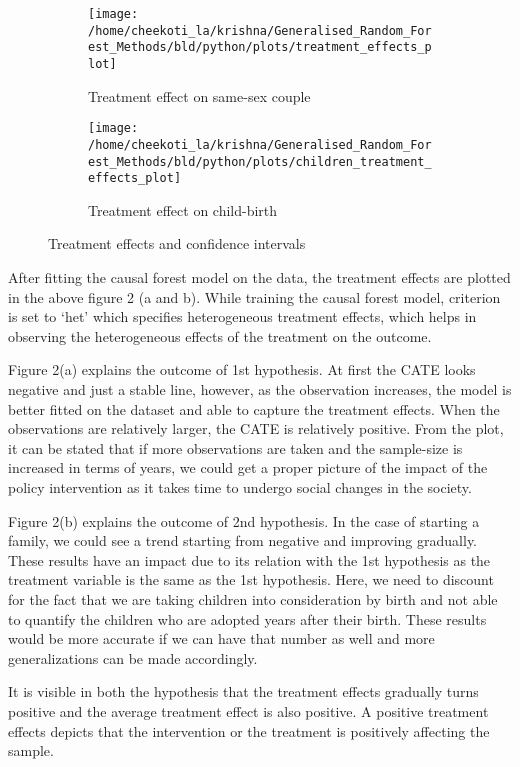 \documentclass[11pt, a4paper, leqno]{article}
\begin{document}
\begin{figure}[!tbp]
  \begin{subfigure}[c]{0.5\textwidth}
    \texttt{[image: /home/cheekoti\_la/krishna/Generalised\_Random\_Forest\_Methods/bld/python/plots/treatment\_effects\_plot]}
    \caption{Treatment effect on same-sex couple}
    \label{fig:f3}
  \end{subfigure}
  \hfill
  \begin{subfigure}[c]{0.5\textwidth}
    \texttt{[image: /home/cheekoti\_la/krishna/Generalised\_Random\_Forest\_Methods/bld/python/plots/children\_treatment\_effects\_plot]}
    \caption{Treatment effect on child-birth}
    \label{fig:f4}
  \end{subfigure}
  \caption{Treatment effects and confidence intervals}
\end{figure}

After fitting the causal forest model on the data, the treatment effects are plotted in the above figure 2 (a and b).
While training the causal forest model, criterion is set to `het' which specifies heterogeneous treatment effects, which helps in observing the heterogeneous effects of the
treatment on the outcome.

Figure 2(a) explains the outcome of 1st hypothesis. At first the CATE looks negative and just a stable line, however, as the observation increases,
 the model is better fitted on the dataset and able to capture the treatment effects. When the observations are relatively larger, the CATE is
 relatively positive. From the plot, it can be stated that if more observations are taken and the sample-size is increased in terms of years, we could
 get a proper picture of the impact of the policy intervention as it takes time to undergo social changes in the society.

Figure 2(b) explains the outcome of 2nd hypothesis. In the case of starting a family, we could see a trend starting from negative and improving
gradually. These results have an impact due to its relation with the 1st hypothesis as the treatment variable is the same as the 1st hypothesis.
Here, we need to discount for the fact that we are taking children into consideration by birth and not able to quantify the children who are adopted
years after their birth. These results would be more accurate if we can have that number as well and more generalizations can be made accordingly.

It is visible in both the hypothesis that the treatment effects gradually turns positive and the average treatment effect is also positive. A
positive treatment effects depicts that the intervention or the treatment is positively affecting the sample.
\end{document}

